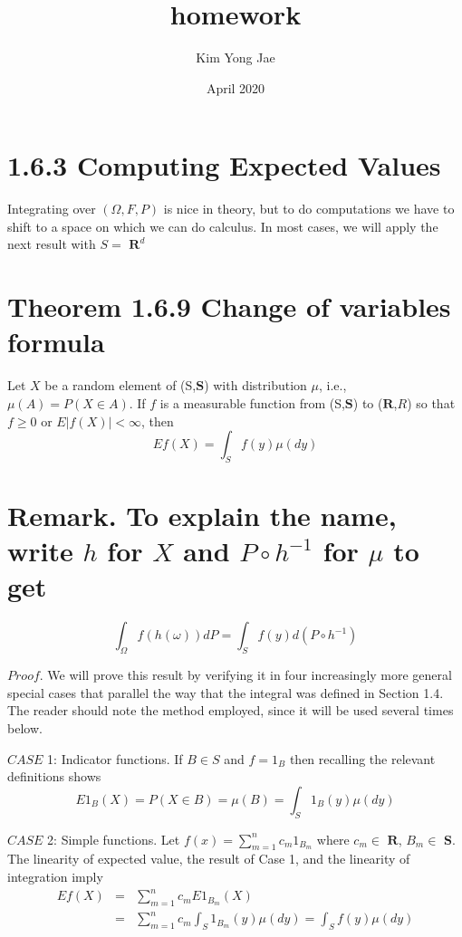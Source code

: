 \documentclass{article}
\title{\vspace{-5.0cm}homework}
\author{Kim Yong Jae}
\date{April 2020}
\begin{document}
\maketitle

\section*{1.6.3 Computing Expected Values}
Integrating over $(\Omega,{F},{P})$ is nice in theory, but to do computations we have to shift to a space on which we can do calculus. In most cases, we
will apply the next result with ${S}=$ \begin{math}\mathbf{R}^d\end{math}

\section*{Theorem 1.6.9 Change of variables formula}
Let ${X}$ be a random element of (S,\begin{math}\mathbf{S}\end{math}) with distribution $\mu$, i.e., $\mu(A) = P(X \in A)$. If ${f}$ is a measurable function from (S,\begin{math}\mathbf{S}\end{math}) to (\begin{math}\mathbf{R}\end{math},${R}$) so that $f \geq 0$ or $E|f(X)| < \infty$, then
$$Ef(X) = \int_S f(y)\mu(dy)$$

\section*{Remark. {\normalsize\normalfont To explain the name, write $h$ for $X$ and $P\circ h^{-1}$ for $\mu$ to get}}
$$\int_\Omega f(h(\omega))dP = \int_S f(y)d(P\circ h^{-1})$$

$Proof.$ We will prove this result by verifying it in four increasingly more general special cases that parallel the way that the integral was defined in Section 1.4. The reader should note the method employed, since it will be used several times below.

$CASE$ 1: Indicator functions. If $B \in S$ and $f = 1_{B}$ then recalling the relevant definitions shows
$$E1_{B}(X) = P(X \in B) = \mu(B) = \int_S 1_{B}(y)\mu(dy)$$

$CASE$ 2: Simple functions. Let $f(x) = \sum_{m=1}^{n} c_m 1_{B_m}$ where $c_m \in$ \begin{math}\mathbf{R}\end{math}, 
$B_m \in$ \begin{math}\mathbf{S}\end{math}. The linearity of expected value, the result of Case 1, and the linearity of integration imply
\begin{eqnarray}
Ef(X) & = & \sum_{m=1}^{n} c_m E1_{B_m}(X) \nonumber\\
& =& \sum_{m=1}^{n} c_m \int_S 1_{B_m}(y)\mu (dy) = \int_S f(y)\mu (dy) \nonumber
\end{eqnarray}
\end{document}
